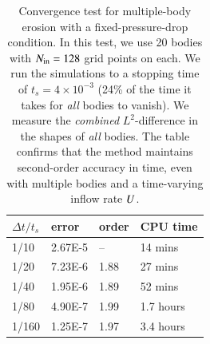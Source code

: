 \documentclass[preprint, 10pt]{elsarticle}
\begin{document}
\begin{table}%
\begin{center}
\caption{Convergence test for multiple-body erosion with a fixed-pressure-drop condition. In this test, we use 20 bodies with $N_{\mathrm{in}} = 128$ grid points on each. We run the simulations to a stopping time of $t_s = 4 \times 10^{-3}$ (24\% of the time it takes for {\em all} bodies to vanish). We measure the {\em combined} $L^2$-difference in the shapes of {\em all} bodies. The table confirms that the method maintains second-order accuracy in time, even with multiple bodies and a time-varying inflow rate $U$.
}
\vspace{0.3 pc}
\label{convtab2}
\begin{tabular}{l l l l}
\hline
\hspace{0.0pc} $\Delta t/t_s$
\hspace{0.5pc} & error 
\hspace{0.5pc} & order
\hspace{0.5pc} & CPU time \\
\hline
%
1/10     	& 2.67E-5  	& --        	& 14 mins  	\\
1/20     	& 7.23E-6  	& 1.88 	& 27 mins  	\\
1/40     	& 1.95E-6  	& 1.89 	& 52 mins  	\\
1/80     	& 4.90E-7  	& 1.99 	& 1.7 hours	\\
1/160     	& 1.25E-7  	& 1.97  	& 3.4 hours	\\
%
\hline
\end{tabular}
\end{center}
\end{table}
\end{document}
